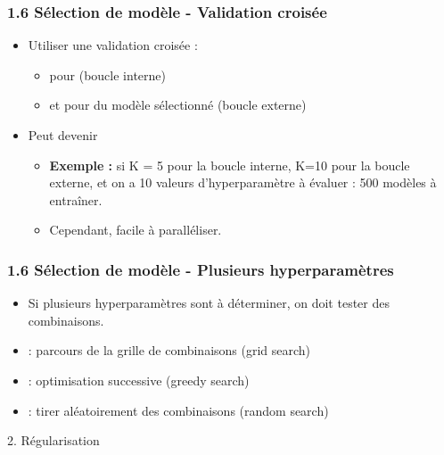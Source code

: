 \begin{frame}
  \frametitle{1.6 Sélection de modèle - Validation croisée}
  \begin{itemize}
  \item Utiliser une validation croisée :
    \begin{itemize}
    \item pour  (boucle interne)
    \item et pour  du modèle sélectionné (boucle externe)
    \end{itemize}
  \item Peut devenir 
    \begin{itemize}
    \item \textbf{Exemple :} si K = 5 pour la boucle interne, K=10 pour la boucle externe, et on a
      10 valeurs d'hyperparamètre à évaluer : 500 modèles à entraîner.
    \item Cependant, facile à paralléliser.
    \end{itemize}
  \end{itemize}
\end{frame}

\begin{frame}
  \frametitle{1.6 Sélection de modèle - Plusieurs hyperparamètres}
  \begin{itemize}
  \item Si plusieurs hyperparamètres sont à déterminer, on doit tester des combinaisons. 
  \item {} : parcours de la grille de combinaisons (grid search)
  \item {} : optimisation successive (greedy search)
  \item {} : tirer aléatoirement des combinaisons (random search)
  \end{itemize}
\end{frame}


\begin{frame}
  \begin{center}
    \large{2. Régularisation}
  \end{center}
\end{frame}

